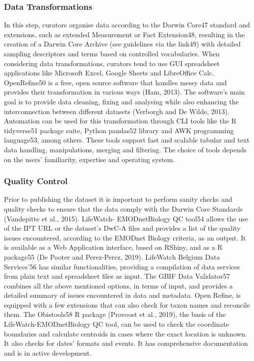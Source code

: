   \subsubsection{Data Transformations}
   In this step, curators organise data according to the Darwin Core47 standard and extensions, such as extended Measurement or Fact Extension48, resulting in the creation of a Darwin Core Archive (see guidelines via the link49) with detailed sampling descriptors and terms based on controlled vocabularies.
When considering data transformations, curators tend to use GUI spreadsheet applications like Microsoft Excel, Google Sheets and LibreOffice Calc. OpenRefine50 is a free, open source software that handles messy data and provides their transformation in various ways (Ham, 2013). The software’s main goal is to provide data cleaning, fixing and analysing while also enhancing the interconnection between different datasets (Verborgh and De Wilde, 2013).
Automation can be used for this transformation through CLI tools like the R tidyverse51 package suite, Python pandas52 library and AWK programming language53, among others. These tools support fast and scalable tabular and text data handling, manipulations, merging and filtering. The choice of tools depends on the users’ familiarity, expertise and operating system.

   \subsubsection{Quality Control}
   Prior to publishing the dataset it is important to perform sanity checks and quality checks to ensure that the data comply with the Darwin Core Standards (Vandepitte et al., 2015). LifeWatch- EMODnetBiology QC tool54 allows the use of the IPT URL or the dataset’s DwC-A files and provides a list of the quality issues encountered, according to the EMODnet Biology criteria, as an output. It is available as a Web Application interface, based on RShiny, and as a R package55 (De Pooter and Perez-Perez, 2019). LifeWatch Belgium Data Services’56 has similar functionalities, providing a compilation of data services from plain text and spreadsheet files as input. The GBIF Data Validator57 combines all the above mentioned options, in terms of input, and provides a detailed summary of issues encountered in data and metadata. Open Refine, is equipped with a few extensions that can also check for taxon names and reconcile them.
   The Obistools58 R package (Provoost et al., 2019), the basis of the LifeWatch-EMODnetBiology QC tool, can be used to check the coordinate boundaries and calculate centroids in cases where the exact location is unknown. It also checks for dates’ formats and events. It has comprehensive documentation and is in active development.

